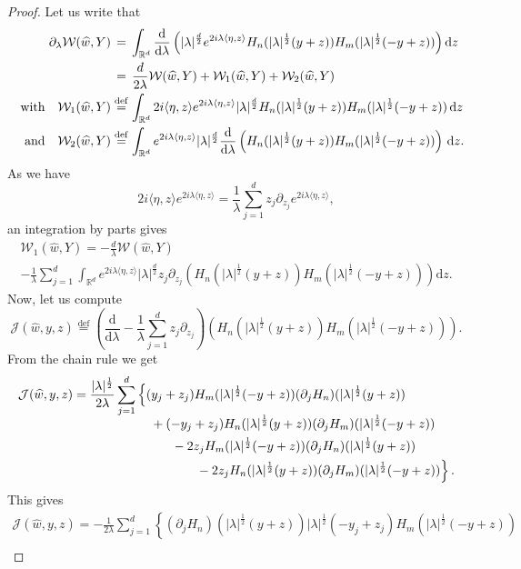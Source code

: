 \documentclass[10pt]{amsart}
\theoremstyle{definition}\newtheorem{defi}[theo]{Definition}\newtheorem{rema}[theo]{Remark}\newtheorem{exam}[theo]{Example}\newtheorem{exem}[theo]{Example}\newtheorem{nota}[theo]{Notation}
\newcommand{\lam}{\lambda}
\newcommand{\wh}{\widehat}
\newcommand*\cJ{\mathcal{J}}
\newcommand*\cW{\mathcal{W}}
\newcommand*\R{\mathbb{R}}
\newcommand{\andf}{\quad\hbox{and}\quad}
\newcommand{\with}{\quad\hbox{with}\quad}
\newcommand*\eqdefa{\overset{\mathrm{def}}{=}}
\newcommand*\peqdefa{\overset{\phantom{\mathrm{def}}}{=}}
\newcommand*{\dd}{\mathrm{d}}
\newcommand{\dz}{\dd z}
\newcommand{\dlambda}{\dd \lambda}
\renewcommand*{\cdotp}{.}
\begin{document}
\begin{proof}
Let us write that
\[
\begin{aligned}
\partial_\lam \cW(\wh w,Y) &\peqdefa \int_{\R^d} \frac{\dd}{\dlambda} \left(|\lam|^{\frac d 2} e^{2i\lam\langle \eta,z\rangle} H_n (|\lam|^{\frac 12} (y+z)) H_m(|\lam|^{\frac 12} (-y+z)) \right) \dz\\
&\peqdefa \frac d {2\lam} \cW(\wh w,Y) +\cW_1(\wh w,Y) + \cW_2(\wh w,Y) \\ \with
\cW_1(\wh w,Y) &\eqdefa
\int_{\R^d} 2i\langle \eta,z\rangle e^{2i\lam\langle \eta,z\rangle} |\lam|^{\frac d 2} H_n (|\lam|^{\frac 12} (y+z)) H_m(|\lam|^{\frac 12} (-y+z))\, \dz\\
\andf \cW_2(\wh w,Y) &\eqdefa
\int_{\R^d} e^{2i\lam\langle \eta,z\rangle} |\lam|^{\frac d 2} \frac{\dd}{\dlambda} \left(H_n (|\lam|^{\frac 12} (y+z)) H_m(|\lam|^{\frac 12} (-y+z))\right)\, \dz.
\end{aligned}
\]
As we have
\[
2i\langle \eta,z\rangle e^{2i\lam\langle \eta,z\rangle } = \frac 1 \lam \sum_{j=1}^d z_j\partial_{z_j} e^{2i\lam\langle \eta,z\rangle },
\]
an integration by parts gives
\begin{multline*}
\cW_1(\wh w,Y) = -\frac d {\lam} \cW(\wh w,Y)\\  -\frac1\lambda \sum_{j=1} ^d \int_{\R^d} e^{2i\lam\langle \eta,z\rangle} |\lam|^{\frac d 2} z_j\partial_{z_j} \left(H_n (|\lam|^{\frac 12} (y+z)) H_m(|\lam|^{\frac 12} (-y+z))\right) \dz.
\end{multline*}
Now, let us compute
\[
\cJ(\wh w,y,z) \eqdefa \left (\frac{\dd}{\dlambda} -\frac1\lambda\sum_{j=1}^d z_j\partial_{z_j}\right) \left(H_n (|\lam|^{\frac 12} (y+z)) H_m(|\lam|^{\frac 12} (-y+z))\right).
\]
From the chain rule we get
\begin{align*}
\cJ(\wh w,y,z) &= \frac {|\lam|^{\frac 12} }{2\lam} \sum_{j=1}^d \left\{ (y_j+z_j) H_m(|\lam|^{\frac 12} (-y+z)) (\partial_j H_n) (|\lam|^{\frac 12} (y+z))\right. \\[-0.5em]
&\mkern 110mu+(-y_j+z_j) H_n (|\lam|^{\frac 12} (y+z)) (\partial_j H_m)(|\lam|^{\frac 12} (-y+z))\\
&\mkern 140mu- 2 z_j H_m(|\lam|^{\frac 12} (-y+z)) (\partial_jH_n) (|\lam|^{\frac 12} (y+z))\\
&\mkern 170mu\left.{} -2 z_j H_n (|\lam|^{\frac 12} (y+z)) (\partial_j H_m)(|\lam|^{\frac 12} (-y+z))
\right\}\cdotp
\end{align*}
This gives
\begin{multline*}
\cJ(\wh w,y,z) = - \frac {1 }{2\lam} \sum_{j=1}^d \left\{ (\partial_j H_n) (|\lam|^{\frac 12} (y+z)) |\lam|^{\frac 12}(-y_j+z_j) H_m(|\lam|^{\frac 12} (-y+z))\right.\\[-0.3em]

\end{multline*}
\end{proof}
\end{document}
